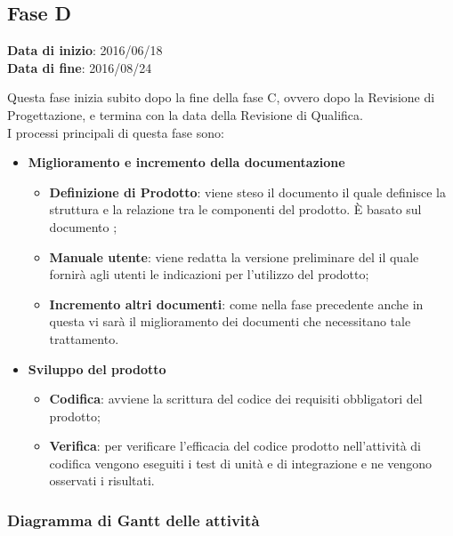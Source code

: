 	\subsection{Fase D}
	\begin{center}
		\textbf{Data di inizio}: 2016/06/18 \\
		\textbf{Data di fine}: 2016/08/24 \\
	\end{center}
	Questa fase inizia subito dopo la fine della fase C, ovvero dopo la Revisione di Progettazione, e termina con la data della Revisione di Qualifica. \\
	I processi principali di questa fase sono: 
		\begin{itemize}
			\item \textbf{Miglioramento e incremento della documentazione}
			\att
			\begin{itemize}
				\item \textbf{Definizione di Prodotto}: viene steso il documento \DPdoc il quale definisce la struttura e la relazione tra le componenti del prodotto. È basato sul documento \STdoc;
				\item \textbf{Manuale utente}: viene redatta la versione preliminare del \MUdoc il quale fornirà agli utenti le indicazioni per l'utilizzo del prodotto;
				\item \textbf{Incremento altri documenti}: come nella fase precedente anche in questa vi sarà il miglioramento dei documenti che necessitano tale trattamento.
			\end{itemize}
			\item \textbf{Sviluppo del prodotto}
			\att
			\begin{itemize}
				\item \textbf{Codifica}: avviene la scrittura del codice dei requisiti obbligatori del prodotto;
				\item \textbf{Verifica}: per verificare l'efficacia del codice prodotto nell'attività di codifica vengono eseguiti i test di unità e di integrazione e ne vengono osservati i risultati. 
			\end{itemize}
		\end{itemize}
		\subsubsection{Diagramma di Gantt delle attività}
		
